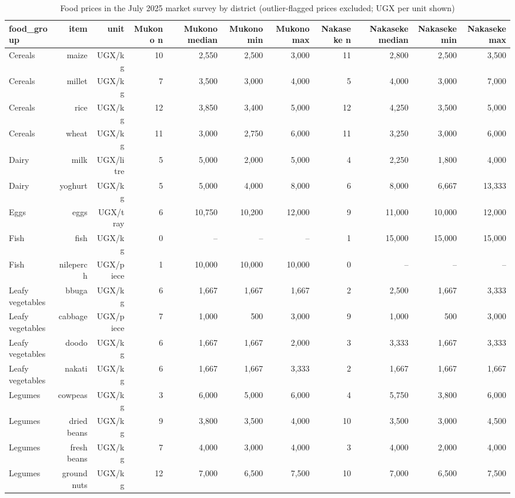 \begin{table}[htbp]
\centering
\caption{Food prices in the July 2025 market survey by district (outlier-flagged prices excluded; UGX per unit shown)}
\label{tab:district_item_prices}
\begin{tabular}{lrrrrrrrrrr}
\toprule
food\_group & item & unit & Mukono n & Mukono median & Mukono min & Mukono max & Nakaseke n & Nakaseke median & Nakaseke min & Nakaseke max \\
\midrule
Cereals & maize & UGX/kg & 10 & 2,550 & 2,500 & 3,000 & 11 & 2,800 & 2,500 & 3,500 \\
Cereals & millet & UGX/kg & 7 & 3,500 & 3,000 & 4,000 & 5 & 4,000 & 3,000 & 7,000 \\
Cereals & rice & UGX/kg & 12 & 3,850 & 3,400 & 5,000 & 12 & 4,250 & 3,500 & 5,000 \\
Cereals & wheat & UGX/kg & 11 & 3,000 & 2,750 & 6,000 & 11 & 3,250 & 3,000 & 6,000 \\
Dairy & milk & UGX/litre & 5 & 5,000 & 2,000 & 5,000 & 4 & 2,250 & 1,800 & 4,000 \\
Dairy & yoghurt & UGX/kg & 5 & 5,000 & 4,000 & 8,000 & 6 & 8,000 & 6,667 & 13,333 \\
Eggs & eggs & UGX/tray & 6 & 10,750 & 10,200 & 12,000 & 9 & 11,000 & 10,000 & 12,000 \\
Fish & fish & UGX/kg & 0 & -- & -- & -- & 1 & 15,000 & 15,000 & 15,000 \\
Fish & nileperch & UGX/piece & 1 & 10,000 & 10,000 & 10,000 & 0 & -- & -- & -- \\
Leafy vegetables & bbuga & UGX/kg & 6 & 1,667 & 1,667 & 1,667 & 2 & 2,500 & 1,667 & 3,333 \\
Leafy vegetables & cabbage & UGX/piece & 7 & 1,000 & 500 & 3,000 & 9 & 1,000 & 500 & 3,000 \\
Leafy vegetables & doodo & UGX/kg & 6 & 1,667 & 1,667 & 2,000 & 3 & 3,333 & 1,667 & 3,333 \\
Leafy vegetables & nakati & UGX/kg & 6 & 1,667 & 1,667 & 3,333 & 2 & 1,667 & 1,667 & 1,667 \\
Legumes & cowpeas & UGX/kg & 3 & 6,000 & 5,000 & 6,000 & 4 & 5,750 & 3,800 & 6,000 \\
Legumes & dried beans & UGX/kg & 9 & 3,800 & 3,500 & 4,000 & 10 & 3,500 & 3,000 & 4,500 \\
Legumes & fresh beans & UGX/kg & 7 & 4,000 & 3,000 & 4,000 & 3 & 4,000 & 2,000 & 4,000 \\
Legumes & groundnuts & UGX/kg & 12 & 7,000 & 6,500 & 7,500 & 10 & 7,000 & 6,500 & 7,500 \\

\end{tabular}
\end{table}

